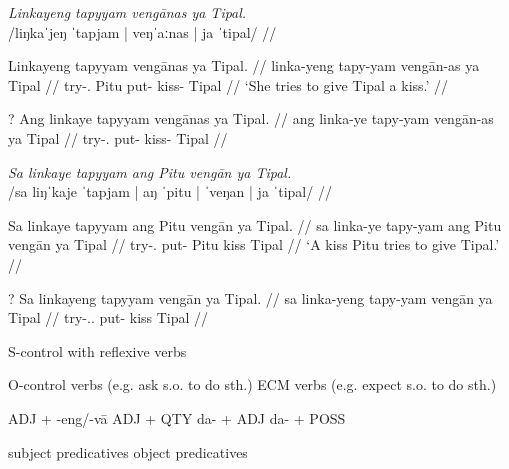 \documentclass[12pt,a4paper]{scrartcl}
\newcommand{\TsgF}{{\Tsg}.{\F}}
\begin{document}
\pex
\a\begingl
\glpreamble \textit{Linkayeng tapyyam vengānas ya Tipal.} \\
	/liŋkaˈjeŋ ˈtapjam | veŋˈaːnas | ja ˈtipal/ //

\gla Linkayeng tapyyam vengānas ya Tipal. //
\glb linka-yeng tapy-yam vengān-as ya Tipal //
\glc try-\TsgF{} \AgtT{} Pitu put-\Ptcp{} kiss-\Parg{} \Loc{} Tipal //
\glft `She tries to give Tipal a kiss.' //
\endgl

\a\ljudge?\begingl
\gla Ang linkaye tapyyam vengānas ya Tipal. //
\glb ang linka-ye tapy-yam vengān-as ya Tipal //
\glc \AgtT{} try-\TsgF{} put-\Ptcp{} kiss-\Parg{} \Loc{} Tipal //
\endgl
\xe

\pex
\a\begingl
\glpreamble \textit{Sa linkaye tapyyam ang Pitu vengān ya Tipal.} \\
	/sa liŋˈkaje ˈtapjam | aŋ ˈpitu | ˈveŋan | ja ˈtipal/ //

\gla Sa linkaye tapyyam ang Pitu vengān ya Tipal. //
\glb sa linka-ye tapy-yam ang Pitu vengān ya Tipal //
\glc \PatT{} try-\TsgF{} put-\Ptcp{} \Aarg{} Pitu kiss \Loc{} Tipal //
\glft `A kiss Pitu tries to give Tipal.' //
\endgl

\a\label{ex:pattopofembeddedditrans}\ljudge?\begingl
\gla Sa linkayeng tapyyam vengān ya Tipal. //
\glb sa linka-yeng tapy-yam vengān ya Tipal //
\glc \PatT{} try-\TsgF{}.\Aarg{} put-\Ptcp{} kiss \Loc{} Tipal //
\endgl
\xe

\ex S-control with reflexive verbs \xe

\ex O-control verbs (e.g. ask s.o. to do sth.) \xe
\ex ECM verbs (e.g. expect s.o. to do sth.) \xe

\ex ADJ + -eng/-vā \xe
\ex ADJ + QTY \xe
\ex da- + ADJ \xe
\ex da- + POSS \xe

\ex subject predicatives \xe
\ex object predicatives \xe

\vfill

\begin{multicols}{2}
\printglossary[style=mysuper,type=\leipzigtype]
\end{multicols}
\end{document}
